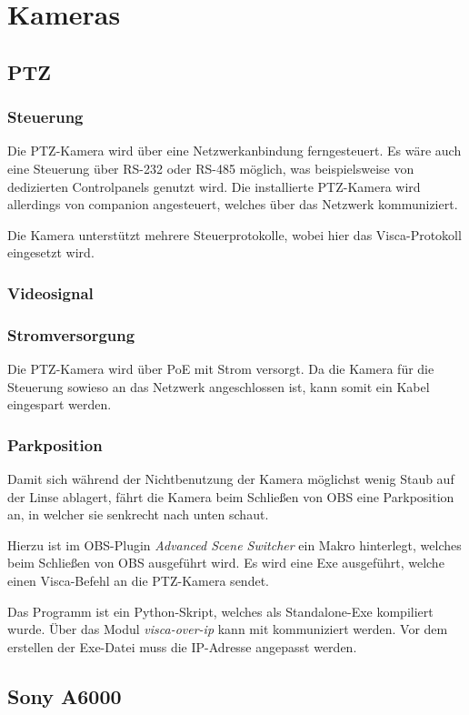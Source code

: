 \chapter{Kameras}
	\section{PTZ}
		\subsection{Steuerung}
			Die \Gls{PTZ-Kamera} wird über eine Netzwerkanbindung ferngesteuert.
			Es wäre auch eine Steuerung über RS-232 oder RS-485 möglich, was beispielsweise von dedizierten Controlpanels genutzt wird.
			Die installierte \Gls{PTZ-Kamera} wird allerdings von \refname{companion} angesteuert, welches über das Netzwerk kommuniziert.

			Die Kamera unterstützt mehrere Steuerprotokolle, wobei hier das \Gls{Visca}-Protokoll eingesetzt wird.
		\subsection{Videosignal}
		\subsection{Stromversorgung}
			Die \Gls{PTZ-Kamera} wird über \Gls{PoE} mit Strom versorgt.
			Da die Kamera für die Steuerung sowieso an das Netzwerk angeschlossen ist, kann somit ein Kabel eingespart werden.
		\subsection{Parkposition}
			Damit sich während der Nichtbenutzung der Kamera möglichst wenig Staub auf der Linse ablagert, fährt die Kamera beim Schließen von OBS eine Parkposition an, in welcher sie senkrecht nach unten schaut.

			Hierzu ist im \Gls{OBS}-Plugin \textit{Advanced Scene Switcher} ein Makro hinterlegt, welches beim Schließen von OBS ausgeführt wird. Es wird eine Exe ausgeführt, welche einen \Gls{Visca}-Befehl an die \Gls{PTZ-Kamera} sendet.

			Das Programm ist ein Python-Skript, welches als Standalone-Exe kompiliert wurde. Über das Modul \textit{visca-over-ip} kann mit  kommuniziert werden. Vor dem erstellen der Exe-Datei muss die IP-Adresse angepasst werden.
	\section{Sony A6000}